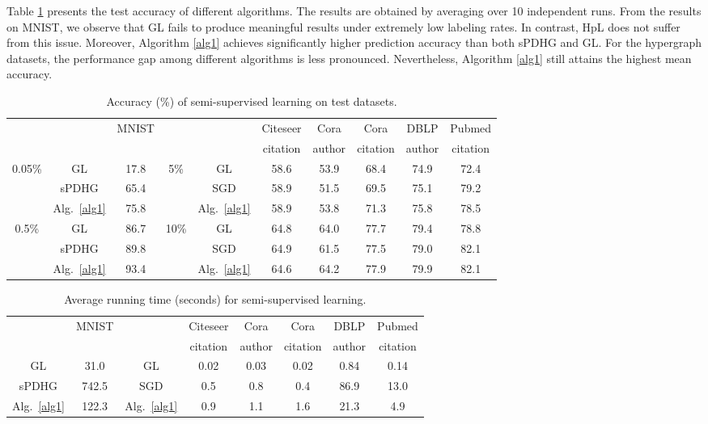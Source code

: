 \documentclass{article}
\theoremstyle{definition}
\begin{document}
Table \ref{table:SSL} presents the test accuracy of different algorithms. The results are obtained by averaging over 10 independent runs.
From the results on MNIST, we observe that GL fails to produce meaningful results under extremely low labeling rates. In contrast, HpL does not suffer from this issue. Moreover, Algorithm \ref{alg1} achieves significantly higher prediction accuracy than both sPDHG and GL.
For the hypergraph datasets, the performance gap among different algorithms is less pronounced. Nevertheless, Algorithm \ref{alg1} still attains the highest mean accuracy.




\begin{table}[htbp]
\centering
\caption{Accuracy (\%) of semi-supervised learning on test datasets.}
\label{table:SSL}
\begin{tabular}{cccccccccc}
\toprule
 &  & MNIST &  &  & Citeseer & Cora & Cora & DBLP & Pubmed \\
 &  &  &  &  & citation & author & citation & author & citation \\
\midrule
\multirow{3}{*}{0.05\%}
& GL & 17.8
& \multirow{3}{*}{5\%}
& GL & 58.6 & 53.9 & 68.4 & 74.9 & 72.4 \\
& sPDHG & 65.4
& & SGD & 58.9 & 51.5 & 69.5 & 75.1 & 79.2 \\
& Alg.~\ref{alg1} & 75.8
& & Alg.~\ref{alg1} & 58.9 & 53.8 & 71.3 & 75.8 & 78.5 \\
\midrule
\multirow{3}{*}{0.5\%}
& GL & 86.7
& \multirow{3}{*}{10\%}
& GL & 64.8 & 64.0 & 77.7 & 79.4 & 78.8 \\
& sPDHG & 89.8
& & SGD & 64.9 & 61.5 & 77.5 & 79.0 & 82.1 \\
& Alg.~\ref{alg1} & 93.4
& & Alg.~\ref{alg1} & 64.6 & 64.2 & 77.9 & 79.9 & 82.1 \\
\bottomrule
\end{tabular}
\end{table}


\begin{table}[htbp]
\centering
\caption{Average running time (seconds) for semi-supervised learning.}
\label{table:time_SSL}
\begin{tabular}{c c c c c c cc}
\toprule
 & MNIST &  & Citeseer & Cora & Cora & DBLP & Pubmed \\
 &  &  & citation & author & citation & author & citation \\
\midrule
GL & 31.0 & GL & 0.02 & 0.03 & 0.02 & 0.84 & 0.14 \\
sPDHG & 742.5 & SGD & 0.5 & 0.8 & 0.4 & 86.9 & 13.0 \\
Alg.\ \ref{alg1} & 122.3 & Alg.\ \ref{alg1} & 0.9 & 1.1 & 1.6 & 21.3 & 4.9 \\
\bottomrule
\end{tabular}
\end{table}
\end{document}

